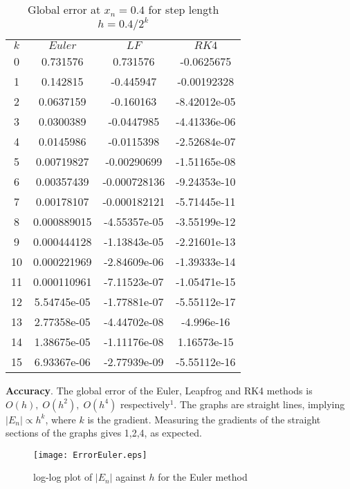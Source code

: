 \documentclass[14pt]{extarticle}
\begin{document}
\begin{table}[h!]
\caption{Global error at $x_n=0.4$ for step length $h=0.4/2^k$}
\centering
\begin{tabular}{cccc}
\\
$k$ & $Euler$ & $LF$ & $RK4$ \\ [0.5ex]
0   &      0.731576 &        0.731576 &      -0.0625675 \\ 
  1 &      0.142815 &       -0.445947 &     -0.00192328 \\ 
  2 &     0.0637159 &       -0.160163 &    -8.42012e-05 \\ 
  3 &     0.0300389 &      -0.0447985 &    -4.41336e-06 \\ 
  4 &     0.0145986 &      -0.0115398 &    -2.52684e-07 \\ 
  5 &    0.00719827 &     -0.00290699 &    -1.51165e-08 \\ 
  6 &    0.00357439 &    -0.000728136 &    -9.24353e-10 \\ 
  7 &    0.00178107 &    -0.000182121 &    -5.71445e-11 \\ 
  8 &   0.000889015 &    -4.55357e-05 &    -3.55199e-12 \\ 
  9 &   0.000444128 &    -1.13843e-05 &    -2.21601e-13 \\ 
 10 &   0.000221969 &    -2.84609e-06 &    -1.39333e-14 \\ 
 11 &   0.000110961 &    -7.11523e-07 &    -1.05471e-15 \\ 
 12 &   5.54745e-05 &    -1.77881e-07 &    -5.55112e-17 \\ 
 13 &   2.77358e-05 &    -4.44702e-08 &      -4.996e-16 \\ 
 14 &   1.38675e-05 &    -1.11176e-08 &     1.16573e-15 \\ 
 15 &   6.93367e-06 &    -2.77939e-09 &    -5.55112e-16 \\ 
\end{tabular}
\label{table:6}
\end{table}

\noindent \textbf{Accuracy}. The global error of the Euler, Leapfrog and RK4 methods is $O(h),\; O(h^2),\; O(h^4)$ respectively$^1$. The graphs are straight lines, implying $|E_n| \propto h^k$, where $k$ is the gradient. Measuring the gradients of the straight sections of the graphs gives 1,2,4, as expected.

\begin{figure}[htp!]
\centering
\texttt{[image: ErrorEuler.eps]}
\caption{log-log plot of $|E_n|$ against $h$ for the Euler method}
\label{figure:3}
\end{figure}
\end{document}
